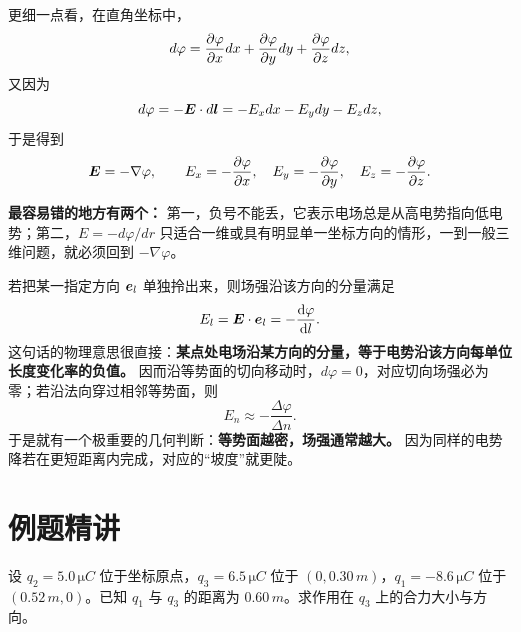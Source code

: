 \documentclass[lang=cn,11pt]{elegantbook}
\begin{document}
更细一点看，在直角坐标中，
\[
d\varphi=\pdv{\varphi}{x}dx+\pdv{\varphi}{y}dy+\pdv{\varphi}{z}dz,
\]
又因为
\[
d\varphi=-\vb*{E}\cdot d\vb*{l}
=-E_xdx-E_ydy-E_zdz,
\]
于是得到
\[
\vb*{E}=-\nabla \varphi,
\qquad
E_x=-\pdv{\varphi}{x},\quad
E_y=-\pdv{\varphi}{y},\quad
E_z=-\pdv{\varphi}{z}.
\]

\begin{note}
\textbf{最容易错的地方有两个：} 第一，负号不能丢，它表示电场总是从高电势指向低电势；第二，\(E=-d\varphi/dr\) 只适合一维或具有明显单一坐标方向的情形，一到一般三维问题，就必须回到 \(-\nabla\varphi\)。
\end{note}

\begin{remark}
若把某一指定方向 \(\vb*{e}_l\) 单独拎出来，则场强沿该方向的分量满足
\[
E_l=\vb*{E}\cdot \vb*{e}_l=-\dv{\varphi}{l}.
\]
这句话的物理意思很直接：\textbf{某点处电场沿某方向的分量，等于电势沿该方向每单位长度变化率的负值。} 因而沿等势面的切向移动时，\(d\varphi=0\)，对应切向场强必为零；若沿法向穿过相邻等势面，则
\[
E_n\approx -\frac{\Delta\varphi}{\Delta n}.
\]
于是就有一个极重要的几何判断：\textbf{等势面越密，场强通常越大。} 因为同样的电势降若在更短距离内完成，对应的“坡度”就更陡。
\end{remark}

\section{例题精讲}

\begin{example}[三点电荷合力的矢量叠加]
设 \(q_2=5.0\,\si{\micro C}\) 位于坐标原点，\(q_3=6.5\,\si{\micro C}\) 位于 \((0,0.30\,\si{m})\)，\(q_1=-8.6\,\si{\micro C}\) 位于 \((0.52\,\si{m},0)\)。已知 \(q_1\) 与 \(q_3\) 的距离为 \(0.60\,\si{m}\)。求作用在 \(q_3\) 上的合力大小与方向。
\end{example}
\end{document}
